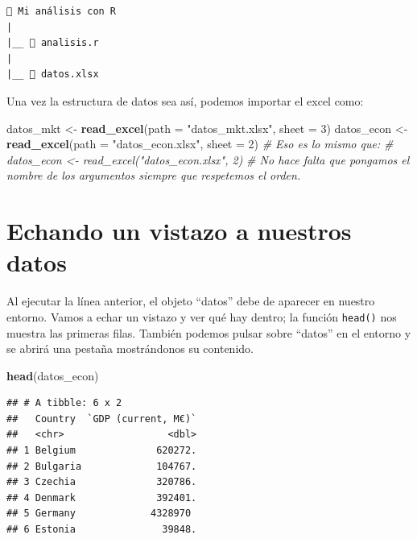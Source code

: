 \documentclass[
]{book}
\newenvironment{Shaded}{\begin{snugshade}}{\end{snugshade}}
\newcommand{\AttributeTok}[1]{\textcolor[rgb]{0.13,0.29,0.53}{#1}}
\newcommand{\CommentTok}[1]{\textcolor[rgb]{0.56,0.35,0.01}{\textit{#1}}}
\newcommand{\DecValTok}[1]{\textcolor[rgb]{0.00,0.00,0.81}{#1}}
\newcommand{\FunctionTok}[1]{\textcolor[rgb]{0.13,0.29,0.53}{\textbf{#1}}}
\newcommand{\NormalTok}[1]{#1}
\newcommand{\OtherTok}[1]{\textcolor[rgb]{0.56,0.35,0.01}{#1}}
\newcommand{\StringTok}[1]{\textcolor[rgb]{0.31,0.60,0.02}{#1}}
\begin{document}
\begin{verbatim}
📁 Mi análisis con R
|
|__ 📃 analisis.r
|
|__ 📃 datos.xlsx
\end{verbatim}

Una vez la estructura de datos sea así, podemos importar el excel como:

\begin{Shaded}
\begin{Highlighting}[]
\NormalTok{datos\_mkt }\OtherTok{\textless{}{-}} \FunctionTok{read\_excel}\NormalTok{(}\AttributeTok{path =} \StringTok{"datos\_mkt.xlsx"}\NormalTok{, }\AttributeTok{sheet =} \DecValTok{3}\NormalTok{)}
\NormalTok{datos\_econ }\OtherTok{\textless{}{-}} \FunctionTok{read\_excel}\NormalTok{(}\AttributeTok{path =} \StringTok{"datos\_econ.xlsx"}\NormalTok{, }\AttributeTok{sheet =} \DecValTok{2}\NormalTok{)}
\CommentTok{\# Eso es lo mismo que: }
\CommentTok{\# datos\_econ \textless{}{-} read\_excel("datos\_econ.xlsx", 2)}
\CommentTok{\# No hace falta que pongamos el nombre de los argumentos siempre que respetemos el orden. }
\end{Highlighting}
\end{Shaded}

\section{Echando un vistazo a nuestros datos}\label{echando-un-vistazo-a-nuestros-datos}

Al ejecutar la línea anterior, el objeto ``datos'' debe de aparecer en nuestro entorno. Vamos a echar un vistazo y ver qué hay dentro; la función \texttt{head()} nos muestra las primeras filas. También podemos pulsar sobre ``datos'' en el entorno y se abrirá una pestaña mostrándonos su contenido.

\begin{Shaded}
\begin{Highlighting}[]
\FunctionTok{head}\NormalTok{(datos\_econ)}
\end{Highlighting}
\end{Shaded}

\begin{verbatim}
## # A tibble: 6 x 2
##   Country  `GDP (current, M€)`
##   <chr>                  <dbl>
## 1 Belgium              620272.
## 2 Bulgaria             104767.
## 3 Czechia              320786.
## 4 Denmark              392401.
## 5 Germany             4328970 
## 6 Estonia               39848.
\end{verbatim}
\end{document}
